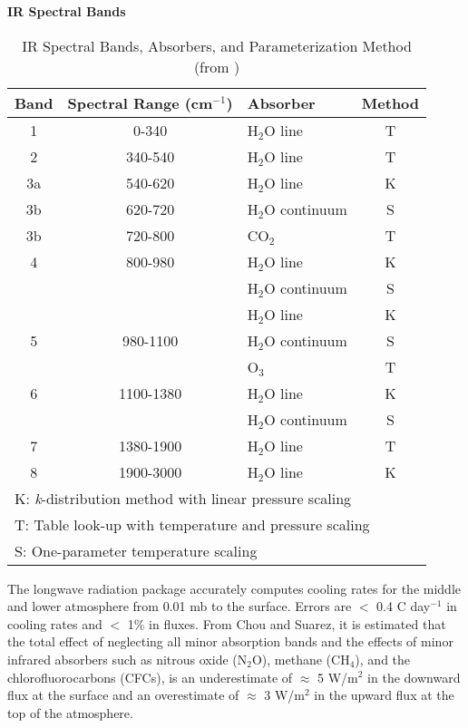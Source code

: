 \begin{table}[htb]
\begin{center}
{\bf IR Spectral Bands} \\
\vspace{0.1in}
\begin{tabular}{|c|c|l|c| } 
\hline
Band & Spectral Range (cm$^{-1}$) & Absorber & Method \\ \hline
\hline
1   & 0-340      & H$_2$O line      & T \\ \hline
2   & 340-540    & H$_2$O line      & T \\ \hline
3a  & 540-620    & H$_2$O line      & K \\ 
3b  & 620-720    & H$_2$O continuum & S \\ 
3b  & 720-800    & CO$_2$           & T \\ \hline 
4   & 800-980    & H$_2$O line      & K \\ 
    &            & H$_2$O continuum & S \\ \hline 
    &            & H$_2$O line      & K \\ 
5   & 980-1100   & H$_2$O continuum & S \\ 
    &            & O$_3$            & T \\ \hline 
6   & 1100-1380  & H$_2$O line      & K \\ 
    &            & H$_2$O continuum & S \\ \hline
7   & 1380-1900  & H$_2$O line      & T \\ \hline 
8   & 1900-3000  & H$_2$O line      & K \\ \hline 
\hline
\multicolumn{4}{|l|}{ \quad K: {\em k}-distribution method with linear pressure scaling } \\
\multicolumn{4}{|l|}{ \quad T: Table look-up with temperature and pressure scaling } \\
\multicolumn{4}{|l|}{ \quad S: One-parameter temperature scaling } \\
\hline
\end{tabular}
\end{center}
\vspace{0.1in}
\caption{IR Spectral Bands, Absorbers, and Parameterization Method (from \cite{chsz:94})}
\label{tab:fizhi:longwave}
\end{table}


The longwave radiation package accurately computes cooling rates for the middle and 
lower atmosphere from 0.01 mb to the surface.  Errors are $<$ 0.4 C day$^{-1}$ in cooling
rates and $<$ 1\% in fluxes.  From Chou and Suarez, it is estimated that the total effect of 
neglecting all minor absorption bands and the effects of minor infrared absorbers such as
nitrous oxide (N$_2$O), methane (CH$_4$), and the chlorofluorocarbons (CFCs), is an underestimate
of $\approx$ 5 W/m$^2$ in the downward flux at the surface and an overestimate of $\approx$ 3 W/m$^2$
in the upward flux at the top of the atmosphere.

